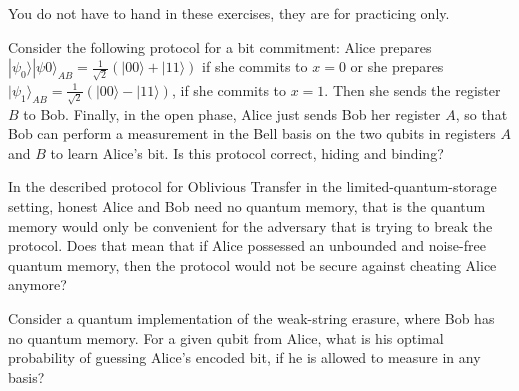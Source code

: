 \documentclass[a4paper,10pt,landscape,twocolumn]{scrartcl}
\newcommand{\ket}[1]{| #1 \rangle}
\begin{document}
\newcommand{\Hi}{\mathcal{H}}

\practiceproblems

{\sffamily\noindent
You do not have to hand in these exercises, they are for practicing only. %
}

\begin{exercise}
Consider the following protocol for a bit commitment: Alice prepares $\ket{\psi_0}|ψ0⟩_{AB}=\frac{1}{\sqrt{2}} ( \ket{00} + \ket{11})$ if she commits to $x=0$ or she prepares $\ket{\psi_1}_{AB} = \frac{1}{\sqrt{2}}  ( \ket{00} - \ket{11})$, if she commits to $x=1$. Then she sends the register $B$ to Bob. Finally, in the open phase, Alice just sends Bob her register $A$, so that Bob can perform a measurement in the Bell basis on the two qubits in registers $A$ and $B$ to learn Alice's bit. 
Is this protocol correct, hiding and binding?
\end{exercise}

\begin{exercise}
In the described protocol for Oblivious Transfer in the limited-quantum-storage setting, honest Alice and Bob need no quantum memory, that is the quantum memory would only be convenient for the adversary that is trying to break the protocol. Does that mean that if Alice possessed an unbounded and noise-free quantum memory, then the protocol would not be secure against cheating Alice anymore?
\end{exercise}

\begin{exercise}
Consider a quantum implementation of the weak-string erasure, where Bob has no quantum memory. For a given qubit from Alice, what is his optimal probability of guessing Alice's encoded bit, if he is allowed to measure in any basis?
\end{exercise}
\end{document}
